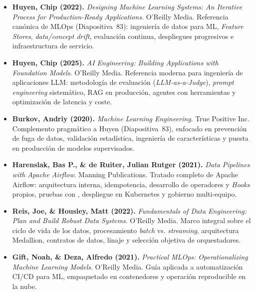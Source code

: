 {\small
\begin{itemize}[itemsep=3pt, topsep=3pt]
  \item \textbf{Huyen, Chip (2022).} \textit{Designing Machine Learning Systems: An Iterative Process for Production-Ready Applications}. O'Reilly Media.
  Referencia canónica de MLOps (Diapositiva~83): ingeniería de datos para ML, \textit{Feature Stores}, \textit{data/concept drift}, evaluación continua, despliegues progresivos e infraestructura de servicio.

  \item \textbf{Huyen, Chip (2025).} \textit{AI Engineering: Building Applications with Foundation Models}. O'Reilly Media.
  Referencia moderna para ingeniería de aplicaciones LLM: metodología de evaluación (\textit{LLM-as-a-Judge}), \textit{prompt engineering} sistemático, RAG en producción, agentes con herramientas y optimización de latencia y coste.

  \item \textbf{Burkov, Andriy (2020).} \textit{Machine Learning Engineering}. True Positive Inc.
  Complemento pragmático a Huyen (Diapositiva~83), enfocado en prevención de fuga de datos, validación estadística, ingeniería de características y puesta en producción de modelos supervisados.

  \item \textbf{Harenslak, Bas P., \& de Ruiter, Julian Rutger (2021).} \textit{Data Pipelines with Apache Airflow}. Manning Publications.
  Tratado completo de Apache Airflow: arquitectura interna, idempotencia, desarrollo de operadores y \textit{Hooks} propios, pruebas con , despliegue en Kubernetes y gobierno multi-equipo.

  \item \textbf{Reis, Joe, \& Housley, Matt (2022).} \textit{Fundamentals of Data Engineering: Plan and Build Robust Data Systems}. O'Reilly Media.
  Marco integral sobre el ciclo de vida de los datos, procesamiento \textit{batch} vs. \textit{streaming}, arquitectura Medallion, contratos de datos, linaje y selección objetiva de orquestadores.

  \item \textbf{Gift, Noah, \& Deza, Alfredo (2021).} \textit{Practical MLOps: Operationalizing Machine Learning Models}. O'Reilly Media.
  Guía aplicada a automatización CI/CD para ML, empaquetado en contenedores y operación reproducible en la nube.
\end{itemize}
}

